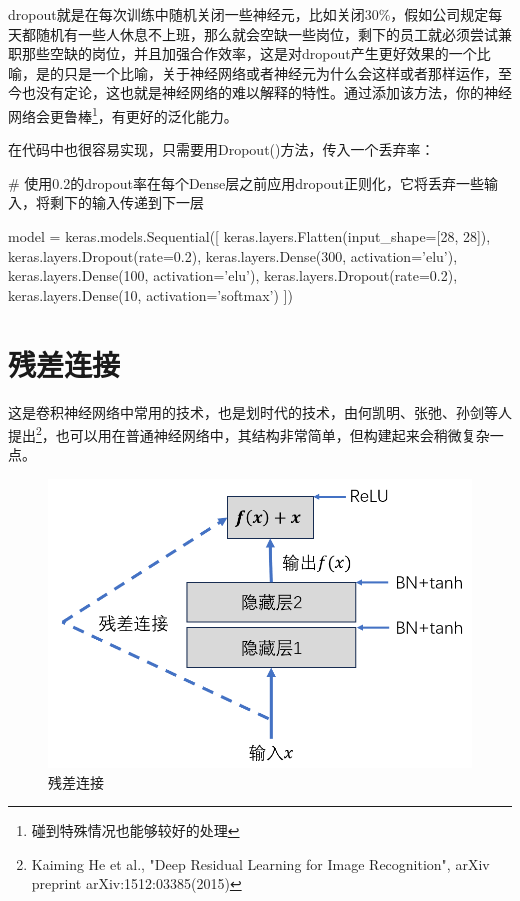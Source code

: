 \documentclass[a5paper, 11pt]{ctexbook}
\begin{document}
\begin{sloppypar}
    dropout就是在每次训练中随机关闭一些神经元，比如关闭30\%，假如公司规定每天都随机有一些人休息不上班，那么就会空缺一些岗位，剩下的员工就必须尝试兼职那些空缺的岗位，并且加强合作效率，这是对dropout产生更好效果的一个比喻，是的只是一个比喻，关于神经网络或者神经元为什么会这样或者那样运作，至今也没有定论，这也就是神经网络的难以解释的特性。通过添加该方法，你的神经网络会更鲁棒\footnote{碰到特殊情况也能够较好的处理}，有更好的泛化能力。
\end{sloppypar}
在代码中也很容易实现，只需要用Dropout()方法，传入一个丢弃率：

\begin{python}
    # 使用0.2的dropout率在每个Dense层之前应用dropout正则化，它将丢弃一些输入，将剩下的输入传递到下一层

    model = keras.models.Sequential([
    keras.layers.Flatten(input_shape=[28, 28]),
    keras.layers.Dropout(rate=0.2),
    keras.layers.Dense(300, activation='elu'),
    keras.layers.Dense(100, activation='elu'),
    keras.layers.Dropout(rate=0.2),
    keras.layers.Dense(10, activation='softmax')
    ])
\end{python}

\newpage

\section{残差连接}\label{残差连接}

这是卷积神经网络中常用的技术，也是划时代的技术，由何凯明、张弛、孙剑等人提出\footnote{Kaiming He et al., "Deep Residual Learning for Image Recognition", arXiv preprint arXiv:1512:03385(2015)}，也可以用在普通神经网络中，其结构非常简单，但构建起来会稍微复杂一点。

\begin{figure}[h!]\label{残差连接图像}
    \centering
    \includegraphics[width=\textwidth]{figures/残差单元.png}
    \caption{残差连接}
\end{figure}
\end{document}

